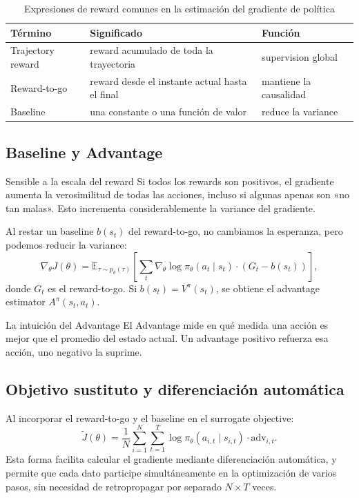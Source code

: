 \documentclass[a4paper]{article}
\begin{document}
\begin{table}[H]
\centering
\small
\begin{tabular}{p{}p{}p{}}
\toprule
Término & Significado & Función \\
\midrule
Trajectory reward & reward acumulado de toda la trayectoria & supervision global \\
Reward-to-go & reward desde el instante actual hasta el final & mantiene la causalidad \\
Baseline & una constante o una función de valor & reduce la variance \\
\bottomrule
\end{tabular}
\caption{Expresiones de reward comunes en la estimación del gradiente de política}
\end{table}

\subsection{Baseline y Advantage}

\begin{warningbox}{Sensible a la escala del reward}
Si todos los rewards son positivos, el gradiente aumenta la verosimilitud de todas las acciones, incluso si algunas apenas son «no tan malas». Esto incrementa considerablemente la variance del gradiente.
\end{warningbox}

Al restar un baseline $b(s_t)$ del reward-to-go, no cambiamos la esperanza, pero podemos reducir la variance:
$$\nabla_\theta J(\theta) = \mathbb{E}_{\tau \sim p_\theta(\tau)} \left[\sum_t \nabla_\theta \log \pi_\theta(a_t \mid s_t) \cdot (G_t - b(s_t))\right],$$
donde $G_t$ es el reward-to-go. Si $b(s_t)=V^\pi(s_t)$, se obtiene el advantage estimator $A^\pi(s_t,a_t)$.

\begin{importantbox}{La intuición del Advantage}
El Advantage mide en qué medida una acción es mejor que el promedio del estado actual. Un advantage positivo refuerza esa acción, uno negativo la suprime.
\end{importantbox}

\subsection{Objetivo sustituto y diferenciación automática}

Al incorporar el reward-to-go y el baseline en el surrogate objective:
$$\tilde{J}(\theta) = \frac{1}{N}\sum_{i=1}^{N}\sum_{t=1}^{T} \log \pi_\theta(a_{i,t} \mid s_{i,t}) \cdot \text{adv}_{i,t}.$$
Esta forma facilita calcular el gradiente mediante diferenciación automática, y permite que cada dato participe simultáneamente en la optimización de varios pasos, sin necesidad de retropropagar por separado $N \times T$ veces.
\end{document}
